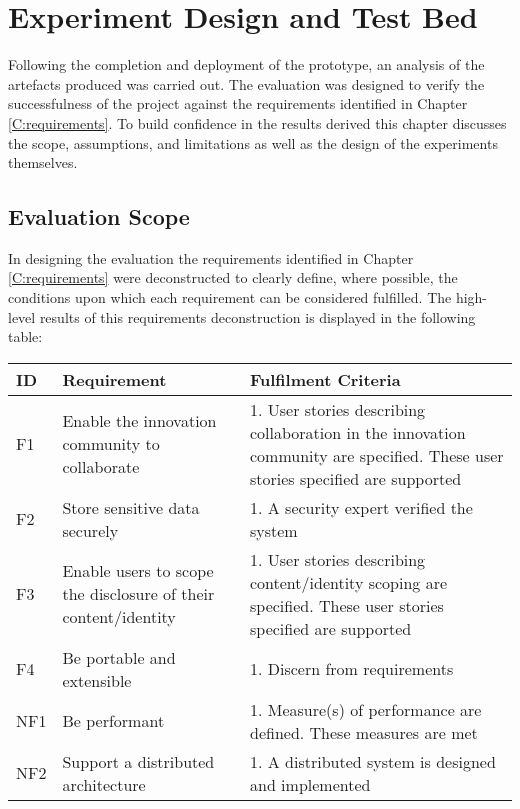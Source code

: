 \chapter{Experiment Design and Test Bed}
Following the completion and deployment of the prototype, an analysis of the artefacts produced was carried out. The evaluation was designed to verify the successfulness of the project against the requirements identified in Chapter \ref{C:requirements}. To build confidence in the results derived this chapter discusses the scope, assumptions, and limitations as well as the design of the experiments themselves.

\section{Evaluation Scope}
In designing the evaluation the requirements identified in Chapter \ref{C:requirements} were deconstructed to clearly define, where possible, the conditions upon which each requirement can be considered fulfilled. The high-level results of this requirements deconstruction is displayed in the following table:
\\
\begin{adjustwidth}{-1.25cm}{}
\begin{tabular}{ |p{1cm}||p{6cm}|p{10cm}|  }
 \hline
 ID & Requirement & Fulfilment Criteria\\
 \hline
    F1 & Enable the innovation community to collaborate & 1. User stories describing collaboration in the innovation 
  community are specified\newline2. These user stories specified are supported\\
\hline
    F2 & Store sensitive data securely & 1. A security expert verified the system\\
\hline
    F3 & Enable users to scope the disclosure of their content/identity & 1. User stories describing content/identity scoping are specified\newline2. These user stories specified are supported\\
 \hline
    F4 & Be portable and extensible & 1. Discern from requirements\\
 \hline
    NF1 & Be performant & 1. Measure(s) of performance are defined\newline2. These measures are met\\
 \hline
    NF2 & Support a distributed architecture & 1. A distributed system is designed and implemented\\
 \hline
\end{tabular}
\end{adjustwidth}
\vspace{1em}

